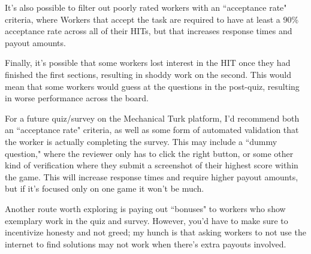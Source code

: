 			It's also possible to filter out poorly rated workers with an ``acceptance rate" criteria, where Workers that accept the task are required to have at least a 90\% acceptance rate across all of their HITs, but that increases response times and payout amounts.

			Finally, it's possible that some workers lost interest in the HIT once they had finished the first sections, resulting in shoddy work on the second. This would mean that some workers would guess at the questions in the post-quiz, resulting in worse performance across the board.

			For a future quiz/survey on the Mechanical Turk platform, I'd recommend both an ``acceptance rate" criteria, as well as some form of automated validation that the worker is actually completing the survey. This may include a ``dummy question," where the reviewer only has to click the right button, or some other kind of verification where they submit a screenshot of their highest score within the game. This will increase response times and require higher payout amounts, but if it's focused only on one game it won't be much.

			Another route worth exploring is paying out ``bonuses" to workers who show exemplary work in the quiz and survey. However, you'd have to make sure to incentivize honesty and not greed; my hunch is that asking workers to not use the internet to find solutions may not work when there's extra payouts involved.











